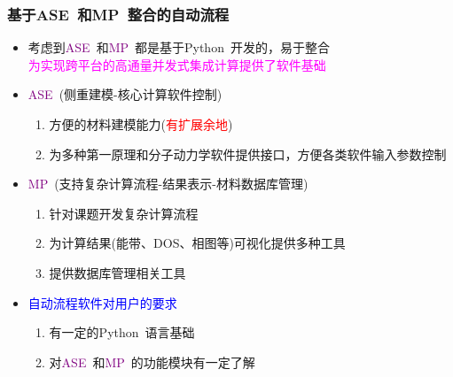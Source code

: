 \documentclass[cjk,slidestop,handout,compress,mathserif,blue]{beamer}	%
\begin{document}
\frame
{
	\frametitle{基于\textrm{ASE~}和\textrm{MP~}整合的自动流程}
	\begin{itemize}
		\item 考虑到\textcolor{purple}{\textrm{ASE~}}和\textcolor{purple}{\textrm{MP~}}都是基于\textrm{Python~}开发的，易于整合\\
			\textcolor{magenta}{为实现跨平台的高通量并发式集成计算提供了软件基础}
		\item \textcolor{purple}{\textrm{ASE~}}(侧重建模-核心计算软件控制)
			\begin{enumerate}
				\item 方便的材料建模能力(\textcolor{red}{有扩展余地})
				\item 为多种第一原理和分子动力学软件提供接口，方便各类软件输入参数控制
			\end{enumerate}
		\item \textcolor{purple}{\textrm{MP~}}(支持复杂计算流程-结果表示-材料数据库管理)
					\begin{enumerate}
						\item 针对课题开发复杂计算流程
						\item 为计算结果(能带、\textrm{DOS}、相图等)可视化提供多种工具
						\item 提供数据库管理相关工具%
					\end{enumerate}
		\item \textcolor{blue}{自动流程软件对用户的要求}
				\begin{enumerate}
					\item 有一定的\textrm{Python~}语言基础
					\item 对\textcolor{purple}{\textrm{ASE~}}和\textcolor{purple}{\textrm{MP~}}的功能模块有一定了解
				\end{enumerate}
	\end{itemize}
}
\end{document}
